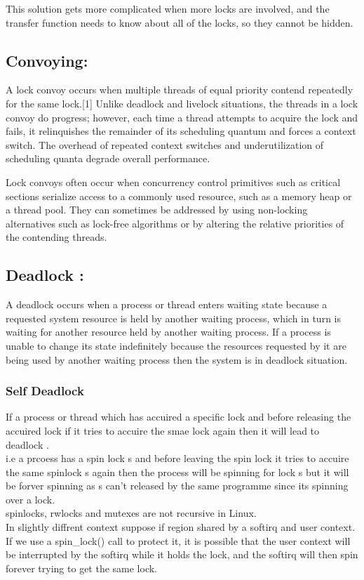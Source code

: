 \documentclass[a4paper]{article}
\begin{document}
This solution gets more complicated when more locks are involved, and the transfer function needs to know about all of the locks, so they cannot be hidden.

\subsection{Convoying:}

A lock convoy occurs when multiple threads of equal priority contend repeatedly for the same lock.[1] Unlike deadlock and livelock situations, the threads in a lock convoy do progress; however, each time a thread attempts to acquire the lock and fails, it relinquishes the remainder of its scheduling quantum and forces a context switch. The overhead of repeated context switches and underutilization of scheduling quanta degrade overall performance.

Lock convoys often occur when concurrency control primitives such as critical sections serialize access to a commonly used resource, such as a memory heap or a thread pool. They can sometimes be addressed by using non-locking alternatives such as lock-free algorithms or by altering the relative priorities of the contending threads.

\subsection{Deadlock : }
A deadlock occurs when a process or thread enters waiting state because a requested system resource is held by another waiting process, which in turn is waiting for another resource held by another waiting process. If a process is unable to change its state indefinitely because the resources requested by it are being used by another waiting process then the system is in deadlock situation.
\subsubsection{Self Deadlock}
If a process or thread which has accuired a specific lock and before releasing the accuired lock if it tries to accuire the smae lock again then it will lead to deadlock .\\
i.e a prcoess has a spin lock s and before leaving the spin lock it tries to accuire the same spinlock s again then the process will be spinning for lock s but it will be forver spinning as s can't released by the same programme since its spinning over a lock.\\
spinlocks, rwlocks and mutexes are not recursive in Linux.\\
In slightly diffrent context suppose if region shared by a softirq and user context. If we use a spin\_lock() call to protect it, it is possible that the user context will be interrupted by the softirq while it holds the lock, and the softirq will then spin forever trying to get the same lock.
\end{document}
